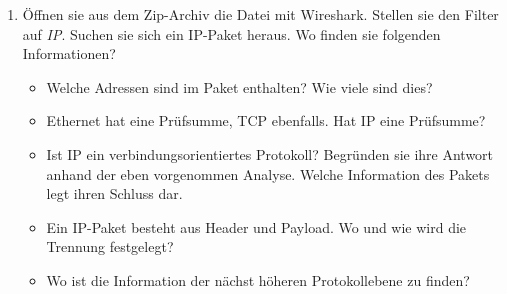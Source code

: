 \documentclass[paper=a4,fontsize=11pt]{scrartcl}%
\numberwithin{equation}{section}
\begin{document}
\begin{enumerate}
	\item Öffnen sie aus dem Zip-Archiv die Datei  mit Wireshark. Stellen sie den Filter auf \emph{IP}. Suchen sie sich ein IP-Paket heraus. Wo finden sie folgenden Informationen?
	\begin{itemize}
		\item Welche Adressen sind im Paket enthalten? Wie viele sind dies?
		\item Ethernet hat eine Prüfsumme, TCP ebenfalls. Hat IP eine Prüfsumme?
		\item Ist IP ein verbindungsorientiertes Protokoll? Begründen sie ihre Antwort anhand der eben vorgenommen Analyse. Welche Information des Pakets legt ihren Schluss dar.
		\item Ein IP-Paket besteht aus Header und Payload. Wo und wie wird die Trennung festgelegt?
		\item Wo ist die Information der nächst höheren Protokollebene zu finden?
	\end{itemize}
\end{enumerate}
\end{document}
